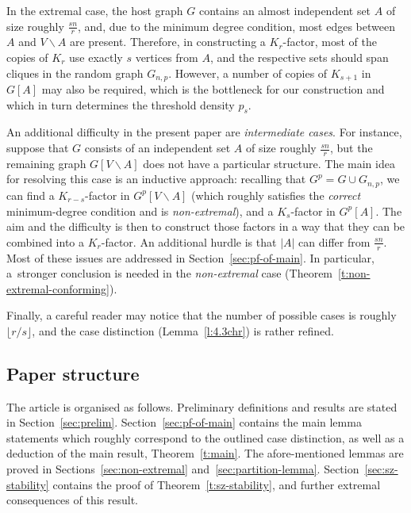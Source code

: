 \documentclass[reqno, 12pt]{amsart}
\numberwithin{equation}{section}
\numberwithin{figure}{section}
\theoremstyle{plain}
\theoremstyle{definition}
\def \Gnp{G_{n,p}}
\let\setminus=\smallsetminus
\begin{document}
    In the extremal case, the host graph $G$ contains an almost independent set $A$ of size roughly $\frac{sn}{r}$, and, due to the minimum degree condition, most edges between $A$ and $V\setminus A$ are present. Therefore, in constructing a $K_r$-factor, most of the copies of $K_r$ use exactly $s$ vertices from $A$, and the respective sets should span cliques in the random graph $\Gnp$. However, a number of copies of $K_{s+1}$ in $G[A]$ may also be required, which is the bottleneck for our construction and which in turn determines the threshold density $p_s$. 

     An additional difficulty in the present paper are \textit{intermediate cases}. For instance, suppose that $G$ consists of an independent set $A$ of size roughly $\frac{sn}{r}$, but the remaining graph $G[V \setminus A]$ does not have a particular structure. The main idea for resolving this case is an inductive approach: recalling that $G^p = G \cup G_{n,p}$, we can find a $K_{r-s}$-factor in $G^p[V \setminus A]$ (which roughly satisfies the \textit{correct} minimum-degree condition and is \textit{non-extremal}), and a $K_s$-factor in $G^p[A]$. The aim and the difficulty is then to construct those factors in a way that they can be combined into a $K_r$-factor. An additional hurdle is that $|A|$ can differ from $\frac{sn}{r}$. Most of these issues are addressed in Section~\ref{sec:pf-of-main}. In particular, a~stronger conclusion is needed in the \textit{non-extremal} case (Theorem~\ref{t:non-extremal-conforming}).
    
    Finally, a careful reader may notice that the number of possible cases is roughly $\lfloor r/s \rfloor$, and the case distinction (Lemma~\ref{l:4.3chr}) is rather refined.
    
      
    \subsection*{Paper structure} 
    The article is organised as follows. Preliminary definitions and results are stated in Section~\ref{sec:prelim}. Section~\ref{sec:pf-of-main} contains the main lemma statements which roughly correspond to the outlined case distinction, as well as a deduction of the main result, Theorem~\ref{t:main}. The afore-mentioned lemmas are proved in Sections~\ref{sec:non-extremal} and~\ref{sec:partition-lemma}. Section~\ref{sec:sz-stability} contains the proof of Theorem~\ref{t:sz-stability}, and further extremal consequences of this result.	
	
	
\end{document}

